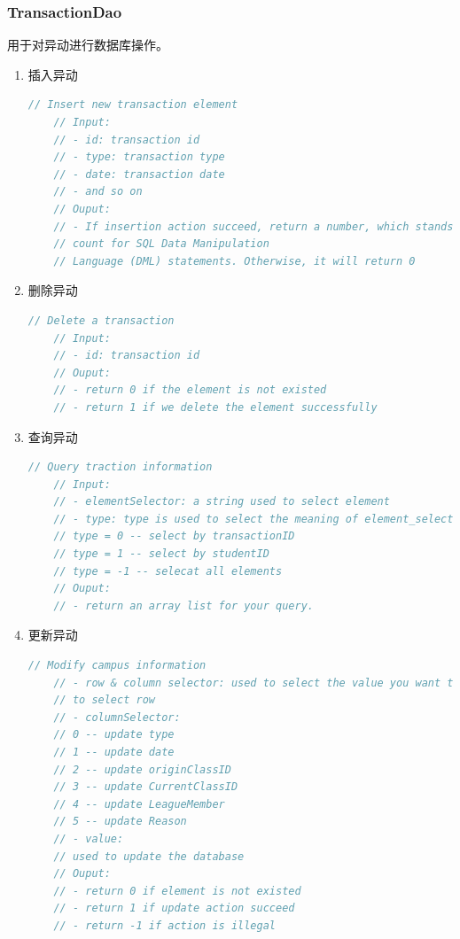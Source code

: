 \documentclass[../report.tex]{subfiles}
\begin{document}
\subsubsection{TransactionDao}
用于对异动进行数据库操作。
\begin{enumerate}
\itemsep 0em
\item 插入异动\\
\begin{lstlisting}[language=java,backgroundcolor=\color{lightgray}]
    // Insert new transaction element
    // Input:
    // - id: transaction id
    // - type: transaction type
    // - date: transaction date
    // - and so on
    // Ouput:
    // - If insertion action succeed, return a number, which stands for the row
    // count for SQL Data Manipulation
    // Language (DML) statements. Otherwise, it will return 0
\end{lstlisting}
\item 删除异动\\
\begin{lstlisting}[language=java,backgroundcolor=\color{lightgray}]
    // Delete a transaction
    // Input:
    // - id: transaction id
    // Ouput:
    // - return 0 if the element is not existed
    // - return 1 if we delete the element successfully
\end{lstlisting}
\item 查询异动\\
\begin{lstlisting}[language=java,backgroundcolor=\color{lightgray}]
    // Query traction information
    // Input:
    // - elementSelector: a string used to select element
    // - type: type is used to select the meaning of element_selector
    // type = 0 -- select by transactionID
    // type = 1 -- select by studentID
    // type = -1 -- selecat all elements
    // Ouput:
    // - return an array list for your query.
\end{lstlisting}
\item 更新异动\\
\begin{lstlisting}[language=java,backgroundcolor=\color{lightgray}]
    // Modify campus information
    // - row & column selector: used to select the value you want to update , use id
    // to select row
    // - columnSelector:
    // 0 -- update type
    // 1 -- update date
    // 2 -- update originClassID
    // 3 -- update CurrentClassID
    // 4 -- update LeagueMember
    // 5 -- update Reason
    // - value:
    // used to update the database
    // Ouput:
    // - return 0 if element is not existed
    // - return 1 if update action succeed
    // - return -1 if action is illegal
\end{lstlisting}
\end{enumerate}
\end{document}
